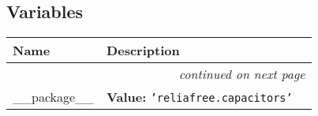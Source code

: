   \subsection{Variables}

    \vspace{-1cm}
\hspace{\varindent}\begin{longtable}{|p{\varnamewidth}|p{\vardescrwidth}|l}
\cline{1-2}
\cline{1-2} \centering \textbf{Name} & \centering \textbf{Description}& \\
\cline{1-2}
\endhead\cline{1-2}\multicolumn{3}{r}{\small\textit{continued on next page}}\\\endfoot\cline{1-2}
\endlastfoot\raggedright \_\-\_\-p\-a\-c\-k\-a\-g\-e\-\_\-\_\- & \raggedright \textbf{Value:} 
{\tt \texttt{'}\texttt{reliafree.capacitors}\texttt{'}}&\\
\cline{1-2}
\end{longtable}

